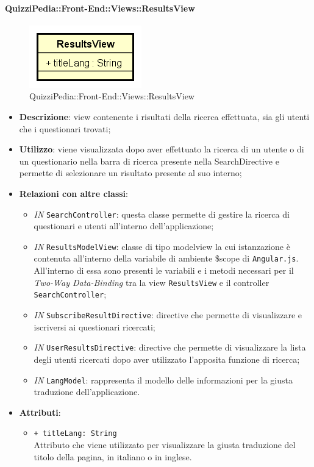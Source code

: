 	
\paragraph{QuizziPedia::Front-End::Views::ResultsView}
\begin{figure} [ht]
	\centering
	\includegraphics[scale=0.80]{UML/Classi/Front-End/QuizziPedia_Front-end_Views_ResultsView.png}
	\caption{QuizziPedia::Front-End::Views::ResultsView}
\end{figure} \FloatBarrier
\begin{itemize}
	\item \textbf{Descrizione}: view contenente i risultati della ricerca effettuata, sia gli utenti che i questionari trovati;
	\item \textbf{Utilizzo}: viene visualizzata dopo aver effettuato la ricerca di un utente o di un questionario nella barra di ricerca presente nella SearchDirective e permette di selezionare un risultato presente al suo interno; 
	\item \textbf{Relazioni con altre classi}:
	\begin{itemize}
		\item \textit{IN} \texttt{SearchController}: questa classe permette di gestire la ricerca di questionari e utenti all'interno dell'applicazione;
		\item \textit{IN} \texttt{ResultsModelView}: classe di tipo modelview la cui istanzazione è contenuta all'interno della variabile di ambiente \$scope di \texttt{Angular.js}. All'interno di essa sono presenti le variabili e i metodi necessari per il \textit{Two-Way Data-Binding} tra la view \texttt{ResultsView} e il controller \texttt{SearchController};
		\item \textit{IN} \texttt{SubscribeResultDirective}: directive che permette di visualizzare e iscriversi ai questionari ricercati;
		\item \textit{IN} \texttt{UserResultsDirective}: directive che permette di visualizzare la lista degli utenti ricercati dopo aver utilizzato l'apposita funzione di ricerca;
		\item \textit{IN} \texttt{LangModel}: rappresenta il modello delle informazioni per la giusta traduzione dell'applicazione.
	\end{itemize}
	\item \textbf{Attributi}:
		\begin{itemize}
			\item \texttt{+ titleLang: String} \\ Attributo che viene utilizzato per visualizzare la giusta traduzione del titolo della pagina, in italiano o in inglese.
		\end{itemize}
\end{itemize}


